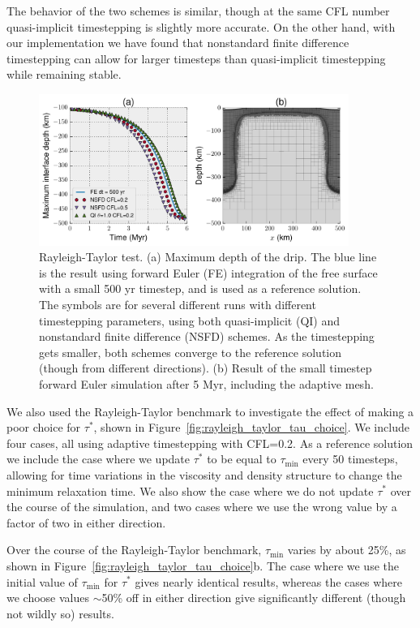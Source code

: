 \documentclass[preprint,12pt,authoryear]{elsarticle}
\begin{document}
The behavior of the two schemes is similar, though at the same CFL number quasi-implicit timestepping is slightly more accurate.
On the other hand, with our implementation we have found that nonstandard finite difference timestepping can allow for larger timesteps 
than quasi-implicit timestepping while remaining stable.

\begin{figure}
\includegraphics[width=0.9\textwidth]{figures/rayleigh_taylor.pdf}
\caption{Rayleigh-Taylor test. (a) Maximum depth of the drip. The blue line is the result using forward Euler (FE) integration of the free surface with a small 500 yr timestep, and is used as a reference solution. The symbols are for several different runs with different timestepping parameters, using both quasi-implicit (QI) and nonstandard finite difference (NSFD) schemes. As the timestepping gets smaller, both schemes converge to the reference solution (though from different directions). (b) Result of the small timestep forward Euler simulation after 5 Myr, including the adaptive mesh.}
\label{fig:rayleigh_taylor}
\end{figure}

We also used the Rayleigh-Taylor benchmark to investigate the effect of making a poor choice for $\tau^*$, shown in Figure~\ref{fig:rayleigh_taylor_tau_choice}.
We include four cases, all using adaptive timestepping with CFL=0.2.
As a reference solution we include the case where we update $\tau^*$ to be equal to $\tau_\mathrm{min}$ every 50 timesteps,
allowing for time variations in the viscosity and density structure to change the minimum relaxation time.
We also show the case where we do not update $\tau^*$ over the course of the simulation, and two cases where
we use the wrong value by a factor of two in either direction.

Over the course of the Rayleigh-Taylor benchmark, $\tau_\mathrm{min}$ varies by about 25\%, as shown in Figure~\ref{fig:rayleigh_taylor_tau_choice}b.
The case where we use the initial value of $\tau_\mathrm{min}$ for $\tau^*$ gives nearly identical results,
whereas the cases where we choose values $\sim$50\% off in either direction give significantly different (though not wildly so) results.
\end{document}
